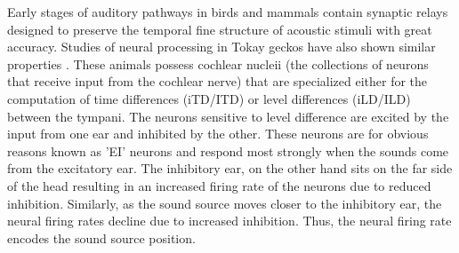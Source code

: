 Early stages of auditory pathways in birds and mammals contain synaptic relays designed to preserve the temporal fine structure of 
acoustic stimuli with great accuracy.  Studies of neural processing in Tokay geckos have also shown similar properties \cite{dalsgaardtangcarr}.
These animals possess cochlear nucleii (the collections of neurons that receive input from the cochlear nerve) that are specialized either for
the computation of time differences (iTD/ITD) or level differences (iLD/ILD) between the tympani. The neurons sensitive to level difference are excited by the 
input from one ear and inhibited by the other. These neurons are for obvious reasons known as 'EI' neurons and respond most strongly when the
sounds come from the excitatory ear. The inhibitory ear, on the other hand sits on the far side of the head resulting in an increased firing
rate of the neurons due to reduced inhibition. Similarly, as the sound source moves closer to the inhibitory ear, the neural firing rates decline
due to increased inhibition. Thus, the neural firing rate encodes the sound source position. 

